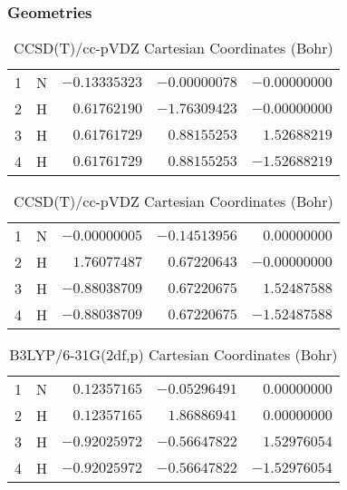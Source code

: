 \documentclass[10pt,oneside]{article}
\begin{document}
\begin{table}[h!]
\subsubsection*{Geometries}
\begin{multicols}{2}
\centering
\caption{CCSD(T)/cc-pVTZ Cartesian Coordinates (Bohr)}
\begin{tabular}{llrrr}
\toprule
1  & N  & $-0.13335323$ & $-0.00000078$ & $-0.00000000$ \\
2  & H  & $ 0.61762190$ & $-1.76309423$ & $-0.00000000$ \\
3  & H  & $ 0.61761729$ & $ 0.88155253$ & $ 1.52688219$ \\
4  & H  & $ 0.61761729$ & $ 0.88155253$ & $-1.52688219$ \\
\bottomrule
\end{tabular}
\caption{CCSD(T)/cc-pVDZ Cartesian Coordinates (Bohr)}
\begin{tabular}{llrrr}
\toprule
1  & N  & $-0.00000005$ & $-0.14513956$ & $ 0.00000000$ \\
2  & H  & $ 1.76077487$ & $ 0.67220643$ & $-0.00000000$ \\
3  & H  & $-0.88038709$ & $ 0.67220675$ & $ 1.52487588$ \\
4  & H  & $-0.88038709$ & $ 0.67220675$ & $-1.52487588$ \\
\bottomrule
\end{tabular}
\end{multicols}
\end{table}

\begin{table}[h]
\centering
\caption{B3LYP/6-31G(2df,p) Cartesian Coordinates (Bohr)}
\begin{tabular}{llrrr}
\toprule
1  & N  & $ 0.12357165$ & $-0.05296491$ & $ 0.00000000$ \\
2  & H  & $ 0.12357165$ & $ 1.86886941$ & $ 0.00000000$ \\
3  & H  & $-0.92025972$ & $-0.56647822$ & $ 1.52976054$ \\
4  & H  & $-0.92025972$ & $-0.56647822$ & $-1.52976054$ \\
\bottomrule
\end{tabular}
\end{table}
\end{document}
